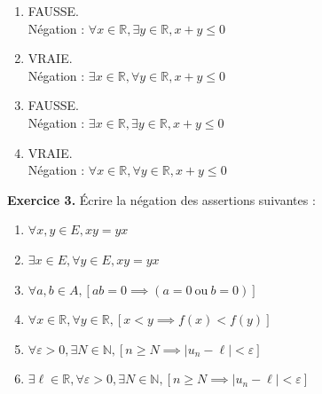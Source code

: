 \documentclass[a4paper, 10pt]{report}
\providecommand{\abs}[1]{\lvert#1\rvert}
\begin{document}
	\colorbox{solution}
	{
		\begin{minipage}{0.9\textwidth}
			\begin{enumerate}[label=\arabic*.]
				\item FAUSSE.\\ Négation : $\forall x \in \mathbb{R},
					\exists y \in \mathbb{R}, x + y \leq 0$
				\item VRAIE.\\ Négation : $\exists x \in \mathbb{R},
					\forall y \in \mathbb{R}, x + y \leq 0$
				\item FAUSSE.\\ Négation : $\exists x \in \mathbb{R},
					\exists y \in \mathbb{R}, x + y \leq 0$
				\item VRAIE.\\ Négation : $\forall x \in \mathbb{R},
					\forall y \in \mathbb{R}, x + y \leq 0$
			\end{enumerate}
		\end{minipage}
	}
		
	\vspace{5mm}
	\noindent
	\textbf{Exercice 3.} Écrire la négation des assertions suivantes :
	
	\begin{enumerate}[label=\arabic*.]
		\item $\forall x, y \in E, xy = yx$
		\item $\exists x \in E, \forall y \in E, xy = yx$
		\item $\forall a, b \in A, [ab = 0 \implies
			(a = 0\ \text{ou}\ b = 0)]$
		\item $\forall x \in \mathbb{R}, \forall y \in \mathbb{R},
			[x < y \implies f(x) < f(y)]$
		\item $\forall \varepsilon > 0, \exists N \in \mathbb{N},
			[n \geq N \implies \abs{u_n - \ell} < \varepsilon]$
		\item $\exists \ell \in \mathbb{R}, \forall \varepsilon > 0,
			\exists N \in \mathbb{N},
			[n \geq N \implies \abs{u_n - \ell} < \varepsilon]$
	\end{enumerate}
	
\end{document}
